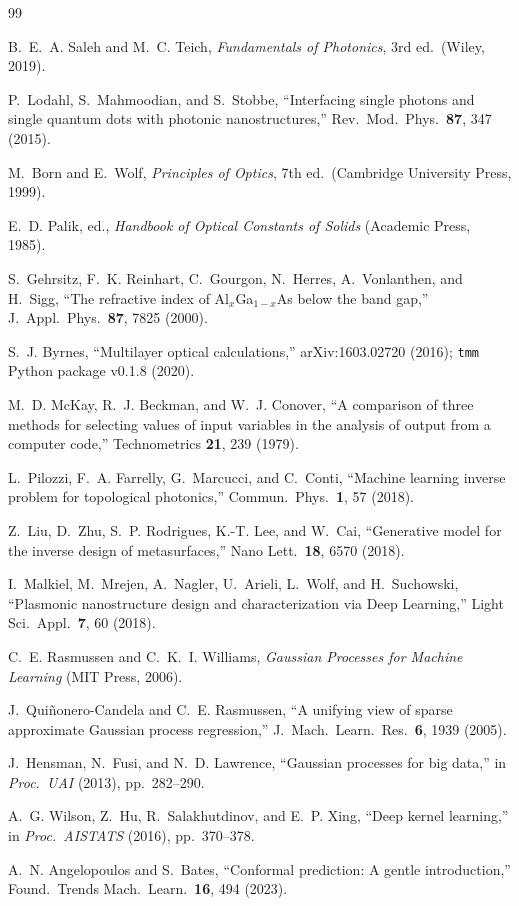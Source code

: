 \documentclass[9pt,twocolumn]{optica-article}
\begin{document}
\begin{thebibliography}{99}

B.~E.~A. Saleh and M.~C. Teich,
\textit{Fundamentals of Photonics}, 3rd ed.\ (Wiley, 2019).

P.~Lodahl, S.~Mahmoodian, and S.~Stobbe,
``Interfacing single photons and single quantum dots with photonic nanostructures,''
Rev.\ Mod.\ Phys.\ \textbf{87}, 347 (2015).

M.~Born and E.~Wolf,
\textit{Principles of Optics}, 7th ed.\ (Cambridge University Press, 1999).

E.~D. Palik, ed.,
\textit{Handbook of Optical Constants of Solids} (Academic Press, 1985).

S.~Gehrsitz, F.~K. Reinhart, C.~Gourgon, N.~Herres, A.~Vonlanthen, and H.~Sigg,
``The refractive index of Al$_x$Ga$_{1-x}$As below the band gap,''
J.\ Appl.\ Phys.\ \textbf{87}, 7825 (2000).

S.~J. Byrnes,
``Multilayer optical calculations,''
arXiv:1603.02720 (2016); \texttt{tmm} Python package v0.1.8 (2020).

M.~D. McKay, R.~J. Beckman, and W.~J. Conover,
``A comparison of three methods for selecting values of input variables in the
analysis of output from a computer code,''
Technometrics \textbf{21}, 239 (1979).

L.~Pilozzi, F.~A. Farrelly, G.~Marcucci, and C.~Conti,
``Machine learning inverse problem for topological photonics,''
Commun.\ Phys.\ \textbf{1}, 57 (2018).

Z.~Liu, D.~Zhu, S.~P. Rodrigues, K.-T. Lee, and W.~Cai,
``Generative model for the inverse design of metasurfaces,''
Nano Lett.\ \textbf{18}, 6570 (2018).

I.~Malkiel, M.~Mrejen, A.~Nagler, U.~Arieli, L.~Wolf, and H.~Suchowski,
``Plasmonic nanostructure design and characterization via Deep Learning,''
Light Sci.\ Appl.\ \textbf{7}, 60 (2018).

C.~E. Rasmussen and C.~K.~I. Williams,
\textit{Gaussian Processes for Machine Learning} (MIT Press, 2006).

J.~Qui\~{n}onero-Candela and C.~E. Rasmussen,
``A unifying view of sparse approximate Gaussian process regression,''
J.\ Mach.\ Learn.\ Res.\ \textbf{6}, 1939 (2005).

J.~Hensman, N.~Fusi, and N.~D. Lawrence,
``Gaussian processes for big data,''
in \textit{Proc.\ UAI} (2013), pp.\ 282--290.

A.~G. Wilson, Z.~Hu, R.~Salakhutdinov, and E.~P. Xing,
``Deep kernel learning,''
in \textit{Proc.\ AISTATS} (2016), pp.\ 370--378.

A.~N. Angelopoulos and S.~Bates,
``Conformal prediction: A gentle introduction,''
Found.\ Trends Mach.\ Learn.\ \textbf{16}, 494 (2023).

\end{thebibliography}
\end{document}
